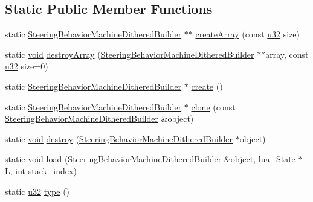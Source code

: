 \subsection*{Static Public Member Functions}
\begin{DoxyCompactItemize}
\item 
static \mbox{\hyperlink{classnjli_1_1_steering_behavior_machine_dithered_builder}{Steering\+Behavior\+Machine\+Dithered\+Builder}} $\ast$$\ast$ \mbox{\hyperlink{classnjli_1_1_steering_behavior_machine_dithered_builder_af8c396516d167e3e7f7f1395383e9dcd}{create\+Array}} (const \mbox{\hyperlink{_util_8h_a10e94b422ef0c20dcdec20d31a1f5049}{u32}} size)
\item 
static \mbox{\hyperlink{_thread_8h_af1e856da2e658414cb2456cb6f7ebc66}{void}} \mbox{\hyperlink{classnjli_1_1_steering_behavior_machine_dithered_builder_aba963cab1835b0dc0d8af1fecb0dcfb1}{destroy\+Array}} (\mbox{\hyperlink{classnjli_1_1_steering_behavior_machine_dithered_builder}{Steering\+Behavior\+Machine\+Dithered\+Builder}} $\ast$$\ast$array, const \mbox{\hyperlink{_util_8h_a10e94b422ef0c20dcdec20d31a1f5049}{u32}} size=0)
\item 
static \mbox{\hyperlink{classnjli_1_1_steering_behavior_machine_dithered_builder}{Steering\+Behavior\+Machine\+Dithered\+Builder}} $\ast$ \mbox{\hyperlink{classnjli_1_1_steering_behavior_machine_dithered_builder_acd55bdeaaf63d843f4d266a382c62938}{create}} ()
\item 
static \mbox{\hyperlink{classnjli_1_1_steering_behavior_machine_dithered_builder}{Steering\+Behavior\+Machine\+Dithered\+Builder}} $\ast$ \mbox{\hyperlink{classnjli_1_1_steering_behavior_machine_dithered_builder_abd47eb891a9e5279d5ed04081e6e95f5}{clone}} (const \mbox{\hyperlink{classnjli_1_1_steering_behavior_machine_dithered_builder}{Steering\+Behavior\+Machine\+Dithered\+Builder}} \&object)
\item 
static \mbox{\hyperlink{_thread_8h_af1e856da2e658414cb2456cb6f7ebc66}{void}} \mbox{\hyperlink{classnjli_1_1_steering_behavior_machine_dithered_builder_a371e2462dc60bbbe246cdf090a0bc793}{destroy}} (\mbox{\hyperlink{classnjli_1_1_steering_behavior_machine_dithered_builder}{Steering\+Behavior\+Machine\+Dithered\+Builder}} $\ast$object)
\item 
static \mbox{\hyperlink{_thread_8h_af1e856da2e658414cb2456cb6f7ebc66}{void}} \mbox{\hyperlink{classnjli_1_1_steering_behavior_machine_dithered_builder_ab3d90dc5f4447cafd8e0baac86566724}{load}} (\mbox{\hyperlink{classnjli_1_1_steering_behavior_machine_dithered_builder}{Steering\+Behavior\+Machine\+Dithered\+Builder}} \&object, lua\+\_\+\+State $\ast$L, int stack\+\_\+index)
\item 
static \mbox{\hyperlink{_util_8h_a10e94b422ef0c20dcdec20d31a1f5049}{u32}} \mbox{\hyperlink{classnjli_1_1_steering_behavior_machine_dithered_builder_ad8dda734039220b56819c987b5258ce1}{type}} ()
\end{DoxyCompactItemize}
